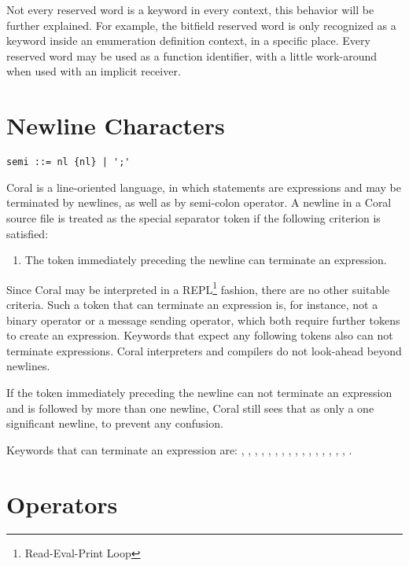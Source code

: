 Not every reserved word is a keyword in every context, this behavior will be further explained. For example, the bitfield reserved word is only recognized as a keyword inside an enumeration definition context, in a specific place. Every reserved word may be used as a function identifier, with a little work-around when used with an implicit receiver.

\section{Newline Characters}\label{sec:newlinecharacters}

\syntax\begin{lstlisting}
semi ::= nl {nl} | ';'
\end{lstlisting}

Coral is a line-oriented language, in which statements are expressions and may be terminated by newlines, as well as by semi-colon operator. A newline in a Coral source file is treated as the special separator token \lstinline@nl@ if the following criterion is satisfied:

\begin{enumerate}
\item The token immediately preceding the newline can terminate an expression.
\end{enumerate}

Since Coral may be interpreted in a REPL\footnote{Read-Eval-Print Loop} fashion, there are no other suitable criteria. Such a token that can terminate an expression is, for instance, not a binary operator or a message sending operator, which both require further tokens to create an expression. Keywords that expect any following tokens also can not terminate expressions. Coral interpreters and compilers do not look-ahead beyond newlines.

If the token immediately preceding the newline can not terminate an expression and is followed by more than one newline, Coral still sees that as only a one significant newline, to prevent any confusion.

Keywords that can terminate an expression are: \lstinline@break@, \lstinline@end@, \lstinline@opaque@, \lstinline@native@, \lstinline@next@, \lstinline@nil@, \lstinline@no@, \lstinline@redo@, \lstinline@retry@, \lstinline@return@, \lstinline@self@, \lstinline@skip@, \lstinline@super@, \lstinline@this@, \lstinline@transparent@, \lstinline@yes@, \lstinline@yield@.

\section{Operators}\label{sec:operators}

